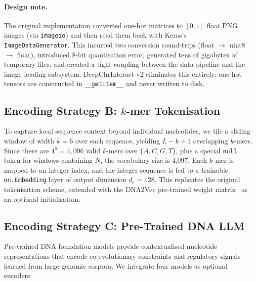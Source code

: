 \paragraph{Design note.}
The original implementation converted one-hot matrices to $[0,1]$ float PNG images
(via \texttt{imageio}) and then read them back with Keras's \texttt{ImageDataGenerator}.
This incurred two conversion round-trips (float $\to$ uint8 $\to$ float), introduced
8-bit quantisation error, generated tens of gigabytes of temporary files, and created
a tight coupling between the data pipeline and the image loading subsystem.
DeepChrInteract-v2 eliminates this entirely: one-hot tensors are constructed in
\texttt{\_\_getitem\_\_} and never written to disk.

\subsection{Encoding Strategy B: \texorpdfstring{$k$}{k}-mer Tokenisation}

To capture local sequence context beyond individual nucleotides, we tile a sliding window
of width $k=6$ over each sequence, yielding $L - k + 1$ overlapping $k$-mers.
Since there are $4^6 = 4{,}096$ valid $k$-mers over $\{A,C,G,T\}$, plus a special
\texttt{null} token for windows containing $N$, the vocabulary size is 4,097.
Each $k$-mer is mapped to an integer index, and the integer sequence is fed to a
trainable \texttt{nn.Embedding} layer of output dimension $d_e = 128$.
This replicates the original tokenisation scheme, extended with the DNA2Vec
pre-trained weight matrix~\cite{deepchrinteract_doc} as an optional initialisation.

\subsection{Encoding Strategy C: Pre-Trained DNA LLM}

Pre-trained DNA foundation models provide contextualised nucleotide representations
that encode co-evolutionary constraints and regulatory signals learned from
large genomic corpora.
We integrate four models as optional encoders:

